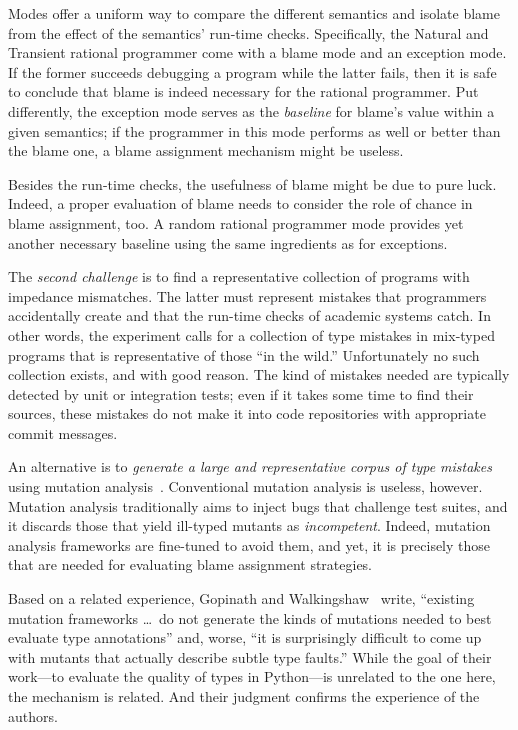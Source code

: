 Modes offer a uniform way to compare the different semantics and  isolate
blame from the effect of the semantics' run-time checks. Specifically, the Natural and
Transient rational programmer come with a blame mode and an exception
mode. If the former succeeds debugging a program while the latter
fails, then it is safe to conclude that blame is indeed necessary for the
rational programmer. Put differently, the exception mode serves as the
{\em baseline\/} for blame's value within a given semantics; if the
programmer in this mode performs as well or better than the  blame one, a blame assignment
mechanism might be useless.

Besides the run-time checks, the usefulness of blame might be due to pure luck.
Indeed, a proper evaluation of blame needs to consider the role of chance in blame assignment, too.
A random rational programmer mode provides yet another necessary baseline using the same ingredients as for exceptions. 

The {\em second challenge\/} is to find a representative collection of
programs with impedance mismatches. The latter must represent mistakes that programmers
accidentally create and that the run-time checks of academic systems catch. In
other words, the experiment calls for a collection of type mistakes in
mix-typed programs that is representative of those ``in the wild.''
Unfortunately no such collection exists, and with good reason. The kind of
mistakes needed are typically detected by unit or integration tests; even if it
takes some time to find their sources, these mistakes do not make it into code
repositories with appropriate commit messages.

An alternative is to {\em generate a large and representative corpus of type
mistakes \/} using mutation analysis~\cite{lipton1971fault, demillo1978hints,
jia2011analysis}. Conventional mutation analysis is useless, however.  Mutation
analysis traditionally aims to inject bugs that challenge test suites, and it
discards those that yield ill-typed mutants as \emph{incompetent}. Indeed,
mutation analysis frameworks are fine-tuned to avoid them, and yet, it is
precisely those that are needed for evaluating blame assignment strategies.

Based on a related experience, Gopinath and Walkingshaw~\cite{gw-mutation} write,
``existing mutation frameworks \ldots\ do not generate the kinds of mutations
needed to best evaluate type annotations'' and, worse, ``it is surprisingly
difficult to come up with mutants that actually describe subtle type faults.''
While the goal of their work---to evaluate the quality of types in
Python---is unrelated to the one here, the mechanism is related. And their
judgment confirms the experience of the authors. 

